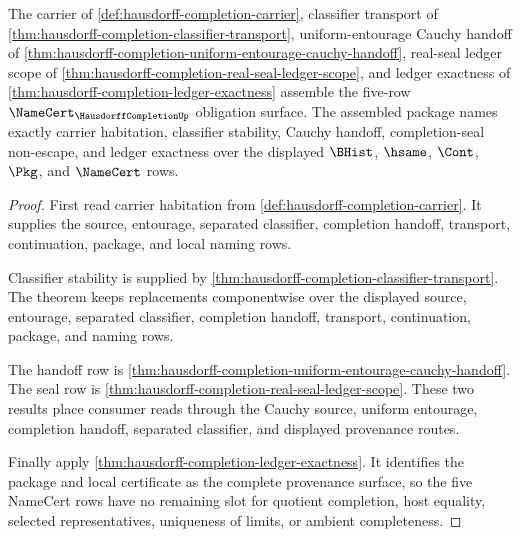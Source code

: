 \begin{theorem}
\label{thm:hausdorff-completion-obligation-unblock-package}
The carrier of \autoref{def:hausdorff-completion-carrier}, classifier transport of \autoref{thm:hausdorff-completion-classifier-transport}, uniform-entourage Cauchy handoff of \autoref{thm:hausdorff-completion-uniform-entourage-cauchy-handoff}, real-seal ledger scope of \autoref{thm:hausdorff-completion-real-seal-ledger-scope}, and ledger exactness of \autoref{thm:hausdorff-completion-ledger-exactness} assemble the five-row $\NameCert_{\HausdorffCompletionUp}$ obligation surface. The assembled package names exactly carrier habitation, classifier stability, Cauchy handoff, completion-seal non-escape, and ledger exactness over the displayed $\BHist$, $\hsame$, $\Cont$, $\Pkg$, and $\NameCert$ rows.
\end{theorem}
\begin{proof}
First read carrier habitation from \autoref{def:hausdorff-completion-carrier}. It supplies the source, entourage, separated classifier, completion handoff, transport, continuation, package, and local naming rows.

Classifier stability is supplied by \autoref{thm:hausdorff-completion-classifier-transport}. The theorem keeps replacements componentwise over the displayed source, entourage, separated classifier, completion handoff, transport, continuation, package, and naming rows.

The handoff row is \autoref{thm:hausdorff-completion-uniform-entourage-cauchy-handoff}. The seal row is \autoref{thm:hausdorff-completion-real-seal-ledger-scope}. These two results place consumer reads through the Cauchy source, uniform entourage, completion handoff, separated classifier, and displayed provenance routes.

Finally apply \autoref{thm:hausdorff-completion-ledger-exactness}. It identifies the package and local certificate as the complete provenance surface, so the five NameCert rows have no remaining slot for quotient completion, host equality, selected representatives, uniqueness of limits, or ambient completeness.
\end{proof}

